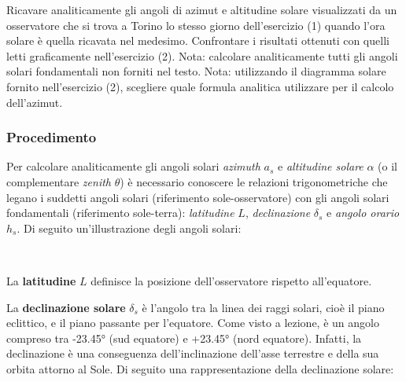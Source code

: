 \documentclass[11pt]{article}
\begin{document}
Ricavare analiticamente gli angoli di azimut e altitudine solare
visualizzati da un osservatore che si trova a Torino lo stesso giorno
dell'esercizio (1) quando l'ora solare è quella ricavata nel medesimo.
Confrontare i risultati ottenuti con quelli letti graficamente
nell'esercizio (2). Nota: calcolare analiticamente tutti gli angoli
solari fondamentali non forniti nel testo. Nota: utilizzando il
diagramma solare fornito nell'esercizio (2), scegliere quale formula
analitica utilizzare per il calcolo dell'azimut.

    \hypertarget{procedimento}{%
\subsubsection{Procedimento}\label{procedimento}}

    Per calcolare analiticamente gli angoli solari \emph{azimuth} \(a_s\) e
\emph{altitudine solare} \(\alpha\) (o il complementare \emph{zenith}
\(\theta\)) è necessario conoscere le relazioni trigonometriche che
legano i suddetti angoli solari (riferimento sole-osservatore) con gli
angoli solari fondamentali (riferimento sole-terra): \emph{latitudine}
\(L\), \emph{declinazione} \(\delta_s\) e \emph{angolo orario} \(h_s\).
Di seguito un'illustrazione degli angoli solari:
 
            
    
    \begin{center}
    \end{center}
    { \hspace*{\fill} \\}
    

    La \textbf{latitudine} \(L\) definisce la posizione dell'osservatore
rispetto all'equatore.

La \textbf{declinazione solare} \(\delta_s\) è l'angolo tra la linea dei
raggi solari, cioè il piano eclittico, e il piano passante per
l'equatore. Come visto a lezione, è un angolo compreso tra -23.45° (sud
equatore) e +23.45° (nord equatore). Infatti, la declinazione è una
conseguenza dell'inclinazione dell'asse terrestre e della sua orbita
attorno al Sole. Di seguito una rappresentazione della declinazione
solare:
 
            
    
    \begin{center}
    \end{center}
    { \hspace*{\fill} \\}
    
\end{document}
